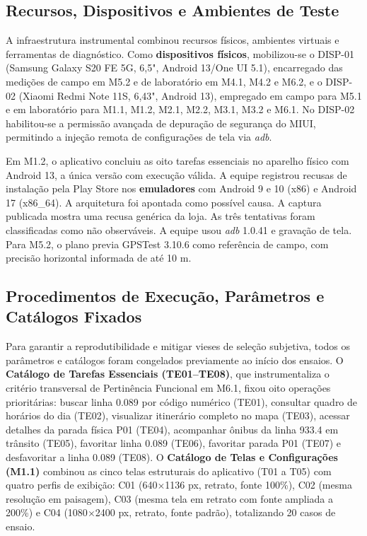 \documentclass[11pt,a4paper]{article}
\begin{document}
\subsection{Recursos, Dispositivos e Ambientes de Teste}
\label{sec:recursos}

A infraestrutura instrumental combinou recursos físicos, ambientes virtuais e ferramentas de diagnóstico. Como \textbf{dispositivos físicos}, mobilizou-se o DISP-01 (Samsung Galaxy S20 FE 5G, 6,5", Android 13/One UI 5.1), encarregado das medições de campo em M5.2 e de laboratório em M4.1, M4.2 e M6.2, e o DISP-02 (Xiaomi Redmi Note 11S, 6,43", Android 13), empregado em campo para M5.1 e em laboratório para M1.1, M1.2, M2.1, M2.2, M3.1, M3.2 e M6.1. No DISP-02 habilitou-se a permissão avançada de depuração de segurança do MIUI, permitindo a injeção remota de configurações de tela via \textit{adb}.

Em M1.2, o aplicativo concluiu as oito tarefas essenciais no aparelho físico com Android 13, a única versão com execução válida. A equipe registrou recusas de instalação pela Play Store nos \textbf{emuladores} com Android 9 e 10 (x86) e Android 17 (x86\_64). A arquitetura foi apontada como possível causa. A captura publicada mostra uma recusa genérica da loja. As três tentativas foram classificadas como não observáveis. A equipe usou \textit{adb} 1.0.41 e gravação de tela. Para M5.2, o plano previa GPSTest 3.10.6 como referência de campo, com precisão horizontal informada de até 10 m.

\subsection{Procedimentos de Execução, Parâmetros e Catálogos Fixados}
\label{sec:procedimentos}

Para garantir a reprodutibilidade e mitigar vieses de seleção subjetiva, todos os parâmetros e catálogos foram congelados previamente ao início dos ensaios. O \textbf{Catálogo de Tarefas Essenciais (TE01--TE08)}, que instrumentaliza o critério transversal de Pertinência Funcional em M6.1, fixou oito operações prioritárias: buscar linha 0.089 por código numérico (TE01), consultar quadro de horários do dia (TE02), visualizar itinerário completo no mapa (TE03), acessar detalhes da parada física P01 (TE04), acompanhar ônibus da linha 933.4 em trânsito (TE05), favoritar linha 0.089 (TE06), favoritar parada P01 (TE07) e desfavoritar a linha 0.089 (TE08). O \textbf{Catálogo de Telas e Configurações (M1.1)} combinou as cinco telas estruturais do aplicativo (T01 a T05) com quatro perfis de exibição: C01 (640$\times$1136 px, retrato, fonte 100\%), C02 (mesma resolução em paisagem), C03 (mesma tela em retrato com fonte ampliada a 200\%) e C04 (1080$\times$2400 px, retrato, fonte padrão), totalizando 20 casos de ensaio.
\end{document}
